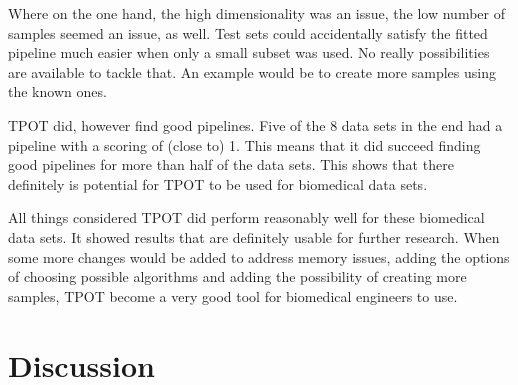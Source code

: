 \documentclass[10pt,a4paper]{article}
\begin{document}
	Where on the one hand, the high dimensionality was an issue, the low number of samples seemed an issue, as well. Test sets could accidentally satisfy the fitted pipeline much easier when only a small subset was used. No really possibilities are available to tackle that. An example would be to create more samples using the known ones.
	
	
	TPOT did, however find good pipelines. Five of the 8 data sets in the end had a pipeline with a scoring of (close to) 1. This means that it did succeed finding good pipelines for more than half of the data sets. This shows that there definitely is potential for TPOT to be used for biomedical data sets.
	
	All things considered TPOT did perform reasonably well for these biomedical data sets. It showed results that are definitely usable for further research. When some more changes would be added to address memory issues, adding the options of choosing possible algorithms and adding the possibility of creating more samples, TPOT become a very good tool for biomedical engineers to use.
	
	\section{Discussion}
	\label{sec:Discussion}
	
	
	
	
	 
	
	
\end{document}
